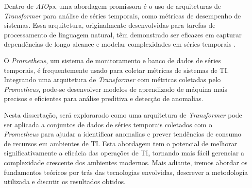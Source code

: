 Dentro de \textit{AIOps}, uma abordagem promissora é o uso de arquiteturas de \textit{Transformer} para análise de séries temporais, como métricas de desempenho de sistemas. Essa arquitetura, originalmente desenvolvidas para tarefas de processamento de linguagem natural, têm demonstrado ser eficazes em capturar dependências de longo alcance e modelar complexidades em séries temporais \cite{vaswani2017attention}. 

O \textit{Prometheus}, um sistema de monitoramento e banco de dados de séries temporais, é frequentemente usado para coletar métricas de sistemas de TI. Integrando uma arquitetura de \textit{Transformer} com métricas coletadas pelo \textit{Prometheus}, pode-se desenvolver modelos de aprendizado de máquina mais precisos e eficientes para análise preditiva e detecção de anomalias.

Nesta dissertação, será explorarado como uma arquitetura de \textit{Transformer} pode ser aplicada a conjuntos de dados de séries temporais coletados com o \textit{Prometheus} para ajudar a identificar anomalias e prever tendências de consumo de recursos em ambientes de TI. Esta abordagem tem o potencial de melhorar significativamente a eficácia das operações de TI, tornando mais fácil gerenciar a complexidade crescente dos ambientes modernos. Mais adiante, iremos abordar os fundamentos teóricos por trás das tecnologias envolvidas, descrever a metodologia utilizada e discutir os resultados obtidos.




















